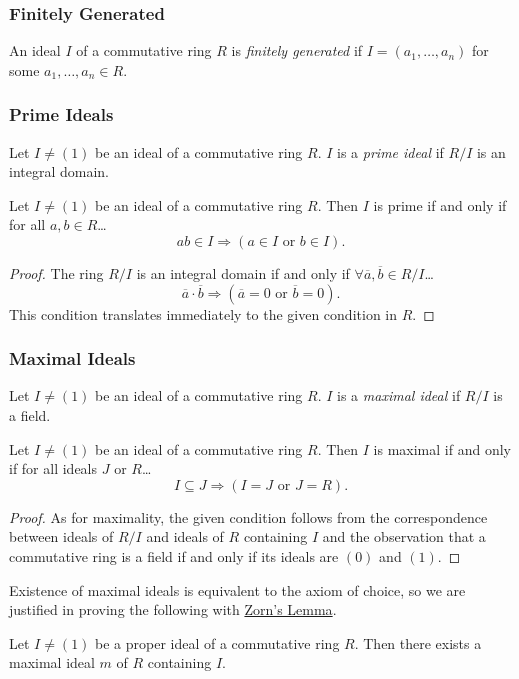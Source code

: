 \subsubsection{Finitely Generated}\label{finitelygenerated}
An ideal $I$ of a commutative ring $R$ is \emph{finitely generated} if $I = (a_1,\dots,a_n)$ for some $a_1, \dots, a_n \in R$.

\subsubsection{Prime Ideals}\label{primeideal}
Let $I \neq (1)$ be an ideal of a commutative ring $R$. $I$ is a \emph{prime ideal} if $R/I$ is an integral domain.

\begin{proposition}
\label{primeidealcharacterization}
Let $I \neq (1)$ be an ideal of a commutative ring $R$. Then $I$ is prime if and only if for all $a,b \in R$\dots
$$ab \in I \Rightarrow (a \in I \textrm{ or } b \in I).$$
\end{proposition}

\begin{proof}
The ring $R/I$ is an integral domain if and only if $\forall \overline{a}, \overline{b} \in R/I$\dots
$$\overline{a} \cdot \overline{b} \Rightarrow (\overline{a} = 0 \textrm{ or } \overline{b} = 0).$$
This condition translates immediately to the given condition in $R$.
\end{proof}

\subsubsection{Maximal Ideals}\label{maximalideal}
Let $I \neq (1)$ be an ideal of a commutative ring $R$. $I$ is a \emph{maximal ideal} if $R/I$ is a field.

\begin{proposition}
\label{maximalidealcharacterization}
Let $I \neq (1)$ be an ideal of a commutative ring $R$. Then $I$ is maximal if and only if for all ideals $J$ or $R$\dots
$$I \subseteq J \Rightarrow (I=J \textrm{ or } J=R).$$
\end{proposition}

\begin{proof}
As for maximality, the given condition follows from the correspondence between ideals of $R/I$ and ideals of $R$ containing $I$
and the observation that a commutative ring is a field if and only if its ideals are $(0)$ and $(1)$.
\end{proof}

\noindent Existence of maximal ideals is equivalent to the axiom of choice, so we are justified in proving the following with \hyperref[zornslemma]{Zorn's Lemma}.

\begin{proposition}
Let $I \neq (1)$ be a proper ideal of a commutative ring $R$. Then there exists a maximal ideal $m$ of $R$ containing $I$.
\end{proposition}